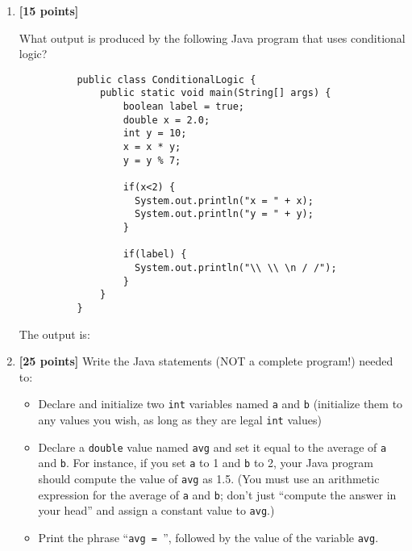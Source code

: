 \begin{enumerate}
\begin{verbatim}
(done || !done)
\end{verbatim}	

\vspace*{-.175in}
The value is: \mbox{\underline{\hspace{3in}}}

\item {\bf [15 points]}

What output is produced by the following Java program that uses conditional logic? 
\begin{verbatim}
          public class ConditionalLogic {
              public static void main(String[] args) {
                  boolean label = true;
                  double x = 2.0;
                  int y = 10;
                  x = x * y;
                  y = y % 7;

                  if(x<2) {
                    System.out.println("x = " + x);
                    System.out.println("y = " + y);
                  }

                  if(label) {
                    System.out.println("\\ \\ \n / /");
                  }
              }
          }
\end{verbatim}
\vspace*{-.05in}
The output is:
\vspace{1in}

\item {\bf [25 points]}
Write the Java statements (NOT a complete program!) needed to:
\begin{itemize}
\item
Declare and initialize two {\tt int} variables named {\tt a} and {\tt b}
(initialize them to any values you wish, as long as they
are legal {\tt int} values)
\item
Declare a {\tt double} value named {\tt avg} and set it equal to the
average of {\tt a} and {\tt b}. For instance, if you set {\tt a} to 1 and
{\tt b} to 2, your Java program should compute the value of {\tt avg} as
1.5. (You must use an arithmetic expression for the 
average of {\tt a} and {\tt b}; don't
just ``compute the answer in your head'' and assign a constant value to {\tt avg}.)
\item
Print the phrase ``\verb$avg = $'', followed by the value of the variable 
{\tt avg}.
\end{itemize}

\vspace{3.5in}


\end{enumerate}
